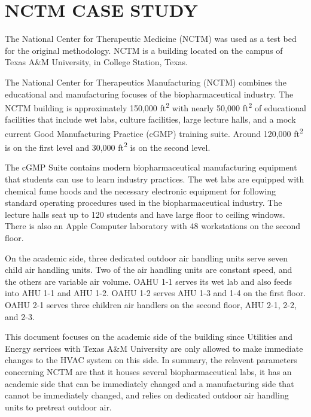\chapter{\uppercase{NCTM Case Study}}
The National Center for Therapeutic Medicine (NCTM) was used as a test
bed for the original methodology. NCTM is a building located on the
campus of Texas A\&M University, in College Station, Texas. 

The National Center for Therapeutics Manufacturing (NCTM) combines the
educational and manufacturing focuses of the biopharmaceutical industry.
The NCTM building is approximately 150,000 ft\textsuperscript{2} with
nearly 50,000 ft\textsuperscript{2} of educational facilities that
include wet labs, culture facilities, large lecture halls, and a mock
current Good Manufacturing Practice (cGMP) training suite. Around
120,000 ft\textsuperscript{2} is on the first level and 30,000
ft\textsuperscript{2} is on the second level. 

The cGMP Suite contains modern biopharmaceutical manufacturing equipment
that students can use to learn industry practices. The wet labs are
equipped with chemical fume hoods and the necessary electronic equipment
for following standard operating procedures used in the
biopharmaceutical industry. The lecture halls seat up to 120 students
and have large floor to ceiling windows. There is also an Apple Computer
laboratory with 48 workstations on the second floor. 

On the academic side, three dedicated outdoor air handling
units serve seven child air handling units. Two of the air handling
units are constant speed, and the others are variable air volume. OAHU
1-1 serves its wet lab and also feeds into AHU 1-1 and AHU 1-2. OAHU
1-2 serves AHU 1-3 and 1-4 on the first floor. OAHU 2-1 serves three
children air handlers on the second floor, AHU 2-1, 2-2, and 2-3. 

This document focuses on the academic side of the building since
Utilities and Energy services with Texas A\&M University are only
allowed to make immediate changes to the HVAC system on this side. In
summary, the relavent parameters concerning NCTM are that it houses
several biopharmaceutical labs, it has an academic side that can be
immediately changed and a manufacturing side that cannot be immediately
changed, and relies on dedicated outdoor air handling units to pretreat
outdoor air. 


